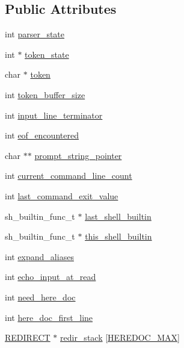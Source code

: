 \subsection*{Public Attributes}
\begin{DoxyCompactItemize}
\item 
int \hyperlink{struct__sh__parser__state__t_a7b1532dc80c2e47e76927f139141b9f7}{parser\+\_\+state}
\item 
int $\ast$ \hyperlink{struct__sh__parser__state__t_a244829887df0a9f52b2345ca53676bbf}{token\+\_\+state}
\item 
char $\ast$ \hyperlink{struct__sh__parser__state__t_acf66652fab7d2d06b98ba68c55b2e9c6}{token}
\item 
int \hyperlink{struct__sh__parser__state__t_accbc03182193e2ac6620034c01f6558c}{token\+\_\+buffer\+\_\+size}
\item 
int \hyperlink{struct__sh__parser__state__t_a0c76836d520b37268713709048223289}{input\+\_\+line\+\_\+terminator}
\item 
int \hyperlink{struct__sh__parser__state__t_acae44fdc78165351620339ff23ef7250}{eof\+\_\+encountered}
\item 
char $\ast$$\ast$ \hyperlink{struct__sh__parser__state__t_ab1fff8eebe02ce1b436200a0915d7ca1}{prompt\+\_\+string\+\_\+pointer}
\item 
int \hyperlink{struct__sh__parser__state__t_ae2216d09a3cf20acf376c7fa719a92d8}{current\+\_\+command\+\_\+line\+\_\+count}
\item 
int \hyperlink{struct__sh__parser__state__t_a558735699f0b5cc25cef0852e806fc51}{last\+\_\+command\+\_\+exit\+\_\+value}
\item 
sh\+\_\+builtin\+\_\+func\+\_\+t $\ast$ \hyperlink{struct__sh__parser__state__t_a8a85e5f70b6e0dda3f02e4028890988b}{last\+\_\+shell\+\_\+builtin}
\item 
sh\+\_\+builtin\+\_\+func\+\_\+t $\ast$ \hyperlink{struct__sh__parser__state__t_a41bd60fdf09f9d03381abca2a70fcb7f}{this\+\_\+shell\+\_\+builtin}
\item 
int \hyperlink{struct__sh__parser__state__t_a2a78f970e9bd4951b46c7c5608c9df0f}{expand\+\_\+aliases}
\item 
int \hyperlink{struct__sh__parser__state__t_a694b50976966ced6beb057bcff29bb7e}{echo\+\_\+input\+\_\+at\+\_\+read}
\item 
int \hyperlink{struct__sh__parser__state__t_a6836ca188e82d08939fbf24dd4565b1a}{need\+\_\+here\+\_\+doc}
\item 
int \hyperlink{struct__sh__parser__state__t_ae3c18bb0af3a20be094360b307aba4be}{here\+\_\+doc\+\_\+first\+\_\+line}
\item 
\hyperlink{command_8h_adeb9f5d937c92c7923aec48ad5e47d57}{R\+E\+D\+I\+R\+E\+CT} $\ast$ \hyperlink{struct__sh__parser__state__t_ada19fb5dc8d70e07f2c75577e7bf9e9d}{redir\+\_\+stack} \mbox{[}\hyperlink{shell_8h_a8cb36393843e65244395d203958dd6cf}{H\+E\+R\+E\+D\+O\+C\+\_\+\+M\+AX}\mbox{]}
\end{DoxyCompactItemize}


